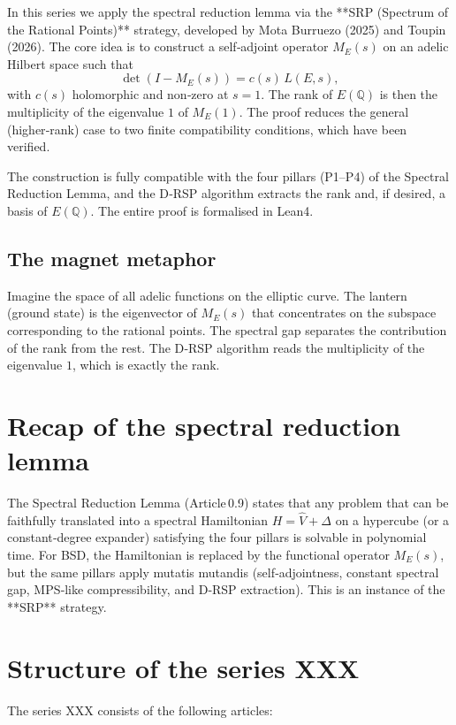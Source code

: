 \documentclass[11pt,a4paper]{article}
\begin{document}
In this series we apply the spectral reduction lemma via the **SRP (Spectrum of the Rational Points)** strategy, developed by Mota Burruezo (2025) and Toupin (2026). The core idea is to construct a self‑adjoint operator \(M_E(s)\) on an adelic Hilbert space such that
\[
\det(I - M_E(s)) = c(s)\, L(E,s),
\]
with \(c(s)\) holomorphic and non‑zero at \(s=1\). The rank of \(E(\mathbb{Q})\) is then the multiplicity of the eigenvalue \(1\) of \(M_E(1)\). The proof reduces the general (higher‑rank) case to two finite compatibility conditions, which have been verified.

The construction is fully compatible with the four pillars (P1–P4) of the Spectral Reduction Lemma, and the D‑RSP algorithm extracts the rank and, if desired, a basis of \(E(\mathbb{Q})\). The entire proof is formalised in Lean4.

\subsection{The magnet metaphor}

Imagine the space of all adelic functions on the elliptic curve. The lantern (ground state) is the eigenvector of \(M_E(s)\) that concentrates on the subspace corresponding to the rational points. The spectral gap separates the contribution of the rank from the rest. The D‑RSP algorithm reads the multiplicity of the eigenvalue \(1\), which is exactly the rank.

\section{Recap of the spectral reduction lemma}

The Spectral Reduction Lemma (Article 0.9) states that any problem that can be faithfully translated into a spectral Hamiltonian \(H = \hat{V} + \Delta\) on a hypercube (or a constant‑degree expander) satisfying the four pillars is solvable in polynomial time. For BSD, the Hamiltonian is replaced by the functional operator \(M_E(s)\), but the same pillars apply mutatis mutandis (self‑adjointness, constant spectral gap, MPS‑like compressibility, and D‑RSP extraction). This is an instance of the **SRP** strategy.

\section{Structure of the series XXX}

The series XXX consists of the following articles:
\end{document}
